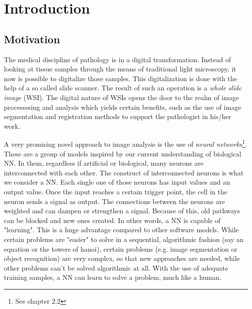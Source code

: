 \chapter{Introduction}

\section{Motivation}
The medical discipline of pathology is in a digital transformation. Instead of looking at tissue samples through the means of traditional light microscopy, it now is possible to digitalize those samples. This digitalization is done with the help of a so called slide scanner. The result of such an operation is a \emph{whole slide image} (WSI)\cite{Cornish13}. The digital nature of WSIs opens the door to the realm of image processesing and analysis which yields certain benefits, such as the use of image segmentation and registration methods to support the pathologist in his/her work.

A very promising novel approach to image analysis is the use of \emph{neural networks}\footnote{See chapter 2.2}. These are a group of models inspired by our current understanding of biological NN. In them, regardless if artificial or biological, many neurons are interconnected with each other. The construct of interconnected neurons is what we consider a NN. Each single one of those neurons has input values and an output value. Once the input reaches a certain trigger point, the cell in the neuron sends a signal as output. The connections between the neurons are weighted and can dampen or strengthen a signal. Because of this, old pathways can be blocked and new ones created. In other words, a NN is capable of "learning"\cite{Kriesel07}. This is a huge advantage compared to other software models. While certain problems are "easier" to solve in a sequential, algorithmic fashion (say an equation or the towers of hanoi), certain problems (e.g. image segmentation or object recognition) are very complex, so that new approaches are needed, while other problems can't be solved algorithmic at all. With the use of adequate training samples, a NN can learn to solve a problem, much like a human.

